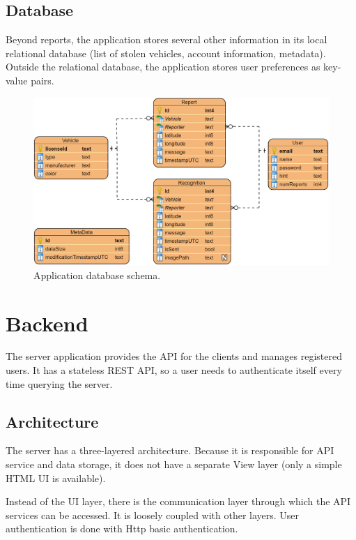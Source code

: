 \subsection{Database}

Beyond reports, the application stores several other information in its local relational database (list of stolen vehicles, account information, metadata). Outside the relational database, the application stores user preferences as key-value pairs.

\begin{figure}[htb]
 \centerline{\includegraphics[width=1.0\columnwidth]{.//Figure/System/AppData.PNG}}
 \caption{Application database schema.}
 \label{fig:simple}
\end{figure}

\section{Backend}

The server application provides the API for the clients and manages registered users. It has a stateless REST API, so a user needs to authenticate itself every time querying the server.

\subsection{Architecture}

The server has a three-layered architecture. Because it is responsible for API service and data storage, it does not have a separate View layer (only a simple HTML UI is available).

Instead of the UI layer, there is the communication layer through which the API services can be accessed. It is loosely coupled with other layers. User authentication is done with Http basic authentication.

